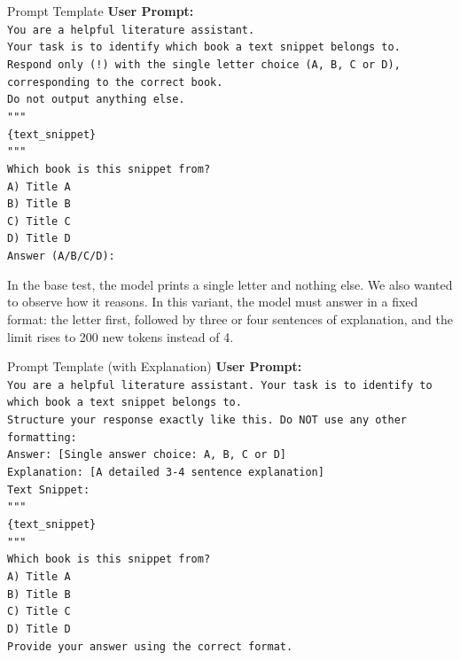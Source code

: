 \documentclass[11pt]{article}
\begin{document}
\begin{promptbox}{Prompt Template}
\small
\vspace{0.5em}
\textbf{User Prompt:} \\
\texttt{You are a helpful literature assistant.}\\
\texttt{Your task is to identify which book a text snippet belongs to.}\\
\texttt{Respond only (!) with the single letter choice (A, B, C or D), corresponding to the correct book.}\\
\texttt{Do not output anything else.}\\
\texttt{"""}\\
\texttt{\{text\_snippet\}}\\
\texttt{"""}\\
\texttt{Which book is this snippet from?}\\
\texttt{A) Title A}\\
\texttt{B) Title B}\\
\texttt{C) Title C}\\
\texttt{D) Title D}\\
\texttt{Answer (A/B/C/D):}
\end{promptbox}

In the base test, the model prints a single letter and nothing else. We also wanted to observe how it reasons. In this variant, the model must answer in a fixed format: the letter first, followed by three or four sentences of explanation, and the limit rises to 200 new tokens instead of 4. 

\begin{promptbox}{Prompt Template (with Explanation)}
\small
\vspace{0.5em}
\textbf{User Prompt:} \\
\texttt{You are a helpful literature assistant. Your task is to identify to which book a text snippet belongs to.}\\
\texttt{Structure your response exactly like this. Do NOT use any other formatting:}\\
\texttt{Answer: [Single answer choice: A, B, C or D]}\\
\texttt{Explanation: [A detailed 3-4 sentence explanation]}\\
\vspace{0.5em}
\texttt{Text Snippet:}\\
\texttt{"""}\\
\texttt{\{text\_snippet\}}\\
\texttt{"""}\\
\vspace{0.5em}
\texttt{Which book is this snippet from?}\\
\texttt{A) Title A}\\
\texttt{B) Title B}\\
\texttt{C) Title C}\\
\texttt{D) Title D}\\
\vspace{0.5em}
\texttt{Provide your answer using the correct format.}
\end{promptbox}
\end{document}

